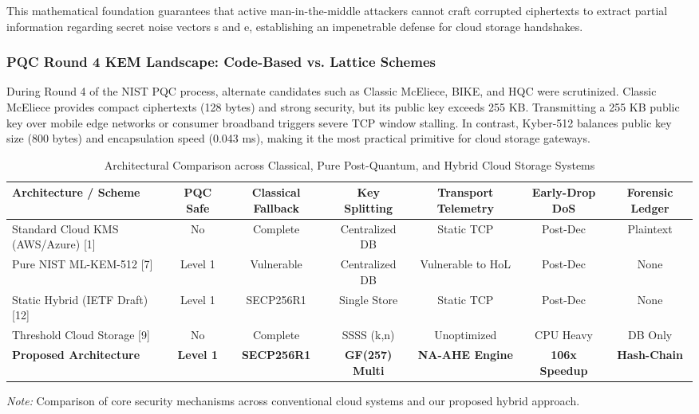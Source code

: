 \documentclass[5p,times]{elsarticle}
\begin{document}
This mathematical foundation guarantees that active man-in-the-middle attackers cannot craft corrupted ciphertexts to extract partial information regarding secret noise vectors s and e, establishing an impenetrable defense for cloud storage handshakes.


\subsubsection{PQC Round 4 KEM Landscape: Code-Based vs. Lattice Schemes}

During Round 4 of the NIST PQC process, alternate candidates such as Classic McEliece, BIKE, and HQC were scrutinized. Classic McEliece provides compact ciphertexts (128 bytes) and strong security, but its public key exceeds 255 KB. Transmitting a 255 KB public key over mobile edge networks or consumer broadband triggers severe TCP window stalling. In contrast, Kyber-512 balances public key size (800 bytes) and encapsulation speed (0.043 ms), making it the most practical primitive for cloud storage gateways.

\begin{table}[!t]
  \centering
  \footnotesize
  \caption{Architectural Comparison across Classical, Pure Post-Quantum, and Hybrid Cloud Storage Systems}
  \label{tab:1}
  \begin{tabularx}{\textwidth}{p{3.2cm}cccccc}
    \toprule
    \textbf{Architecture / Scheme} & \textbf{PQC Safe} & \textbf{Classical Fallback} & \textbf{Key Splitting} & \textbf{Transport Telemetry} & \textbf{Early-Drop DoS} & \textbf{Forensic Ledger} \\
    \midrule
    Standard Cloud KMS (AWS/Azure) [1] & No & Complete & Centralized DB & Static TCP & Post-Dec & Plaintext \\
    Pure NIST ML-KEM-512 [7] & Level 1 & Vulnerable & Centralized DB & Vulnerable to HoL & Post-Dec & None \\
    Static Hybrid (IETF Draft) [12] & Level 1 & SECP256R1 & Single Store & Static TCP & Post-Dec & None \\
    Threshold Cloud Storage [9] & No & Complete & SSSS (k,n) & Unoptimized & CPU Heavy & DB Only \\
    \textbf{Proposed Architecture} & \textbf{Level 1} & \textbf{SECP256R1} & \textbf{GF(257) Multi} & \textbf{NA-AHE Engine} & \textbf{106x Speedup} & \textbf{Hash-Chain} \\
    \bottomrule
  \end{tabularx}
  \vspace{2pt}
  \flushleft\scriptsize \textit{Note:} Comparison of core security mechanisms across conventional cloud systems and our proposed hybrid approach.
\end{table}
\end{document}
